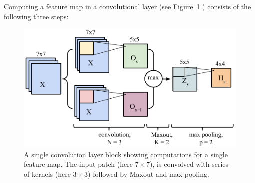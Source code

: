 \documentclass[final,5p,times,twocolumn]{elsarticle}
\newcommand{\PMJ}[1]{\textcolor{green}{\small{}[\textbf{Pierre-Marc:} #1]}}
\begin{document}
Computing a feature map in a convolutional layer (see Figure~\ref{fig::convlayer} ) consists of the following three steps:

\begin{figure}

\centering

\includegraphics[width=0.75 \linewidth]{convlayer.pdf}

\caption{A single convolution layer block showing computations for a single feature map. The input patch (here $7 \times 7$), is convolved with series of kernels (here $3 \times 3$) followed by Maxout and max-pooling. }

\label{fig::convlayer}
\end{figure}
\end{document}
